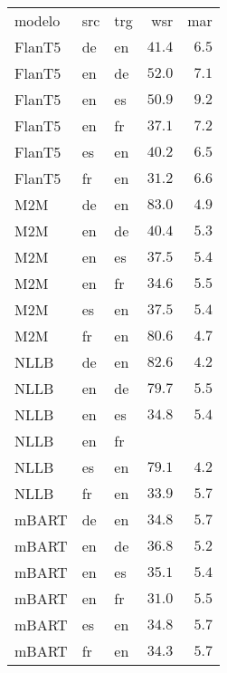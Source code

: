 \begin{tabular}{lllrr}
modelo & src & trg & wsr & mar \\
FlanT5 & de & en & $41.4$ & $6.5$ \\
FlanT5 & en & de & $52.0$ & $7.1$ \\
FlanT5 & en & es & $50.9$ & $9.2$ \\
FlanT5 & en & fr & $37.1$ & $7.2$ \\
FlanT5 & es & en & $40.2$ & $6.5$ \\
FlanT5 & fr & en & $31.2$ & $6.6$ \\
M2M & de & en & $83.0$ & $4.9$ \\
M2M & en & de & $40.4$ & $5.3$ \\
M2M & en & es & $37.5$ & $5.4$ \\
M2M & en & fr & $34.6$ & $5.5$ \\
M2M & es & en & $37.5$ & $5.4$ \\
M2M & fr & en & $80.6$ & $4.7$ \\
NLLB & de & en & $82.6$ & $4.2$ \\
NLLB & en & de & $79.7$ & $5.5$ \\
NLLB & en & es & $34.8$ & $5.4$ \\
NLLB & en & fr &  &  \\
NLLB & es & en & $79.1$ & $4.2$ \\
NLLB & fr & en & $33.9$ & $5.7$ \\
mBART & de & en & $34.8$ & $5.7$ \\
mBART & en & de & $36.8$ & $5.2$ \\
mBART & en & es & $35.1$ & $5.4$ \\
mBART & en & fr & $31.0$ & $5.5$ \\
mBART & es & en & $34.8$ & $5.7$ \\
mBART & fr & en & $34.3$ & $5.7$ \\
\end{tabular}
